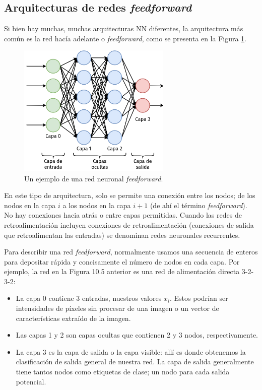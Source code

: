 \documentclass[a4paper,12pt]{article}
\begin{document}
\clearpage

\subsection{Arquitecturas de redes \textit{feedforward}}

Si bien hay muchas, muchas arquitecturas NN diferentes, la arquitectura más común es la red hacía adelante o \textit{feedforward}, como se presenta en la Figura \ref{fig:nnff}.

\begin{figure}[H]
	\begin{center}				
		\includegraphics[width=0.65\textwidth]{022.png}
		\caption{Un ejemplo de una red neuronal \textit{feedforward}.}
		\label{fig:nnff}
	\end{center}
\end{figure}

En este tipo de arquitectura, solo se permite una conexión entre los nodos; de los nodos en la capa $i$ a los nodos en la capa $i + 1$ (de ahí el término \textit{feedforward}). No hay conexiones hacia atrás o entre capas permitidas. Cuando las redes de retroalimentación incluyen conexiones de retroalimentación (conexiones de salida que retroalimentan las entradas) se denominan redes neuronales recurrentes.

Para describir una red \textit{feedforward}, normalmente usamos una secuencia de enteros para depositar rápida y concisamente el número de nodos en cada capa. Por ejemplo, la red en la Figura 10.5 anterior es una red de alimentación directa 3-2-3-2:

\begin{itemize}[noitemsep, topsep=2pt]
	\item La capa 0 contiene 3 entradas, nuestros valores $x_i$. Estos podrían ser intensidades de píxeles sin procesar de una imagen o un vector de características extraído de la imagen.
	\item Las capas 1 y 2 son capas ocultas que contienen 2 y 3 nodos, respectivamente.
	\item La capa 3 es la capa de salida o la capa visible: allí es donde obtenemos la clasificación de salida general de nuestra red. La capa de salida generalmente tiene tantos nodos como etiquetas de clase; un nodo para cada salida potencial.
\end{itemize}
\end{document}
